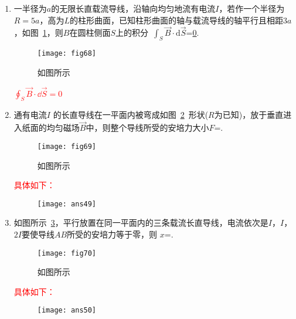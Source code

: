 \begin{enumerate}
    \item 一半径为$a$的无限长直载流导线，沿轴向均匀地流有电流$I$，若作一个半径为$R=5a$，高为$L$的柱形曲面，已知柱形曲面的轴与载流导线的轴平行且相距$3a$，如图~\ref{Fig:68}，则$B$在圆柱侧面$S$上的积分~$\int_S \vec{B}\cdot \mathrm{d} \vec{S}$=\underline{0}.
    \begin{figure}[H]
        \centering
        \texttt{[image: fig68]}
        \caption{如图所示}\label{Fig:68}
    \end{figure}
    \begin{note}
        \textcolor{red}{$\oint_S \vec{B}\cdot \dd \vec{S}=0$}
    \end{note}
    \item 通有电流$I$ 的长直导线在一平面内被弯成如图~\ref{Fig:69}~形状($R$为已知)，放于垂直进入纸面的均匀磁场$\vec{B}$中，则整个导线所受的安培力大小$F$=.
     \begin{figure}[H]
        \centering
        \texttt{[image: fig69]}
        \caption{如图所示}\label{Fig:69}
    \end{figure} 
    \begin{note}
        \textcolor{red}{具体如下：}
        \begin{figure}[H]
            \centering
            \texttt{[image: ans49]}
        \end{figure}
    \end{note}
    \item 如图所示~\ref{Fig:70}，平行放置在同一平面内的三条载流长直导线，电流依次是$I$，$I$，$2I$要使导线$AB$所受的安培力等于零，则
    $x$=.
    \begin{figure}[H]
        \centering
        \texttt{[image: fig70]}
        \caption{如图所示}\label{Fig:70}
    \end{figure}
    \begin{note}
        \textcolor{red}{具体如下：}
        \begin{figure}[H]
            \centering
            \texttt{[image: ans50]}
        \end{figure}
    \end{note}
\end{enumerate}

